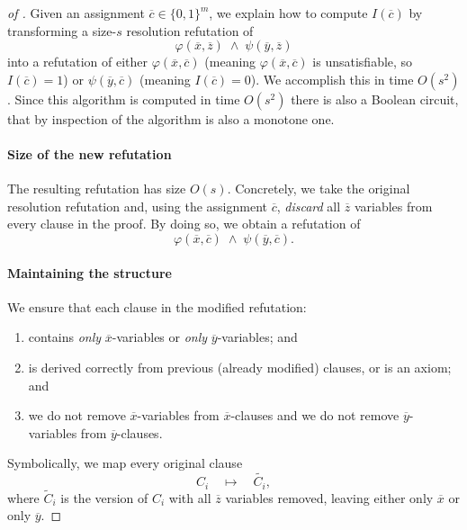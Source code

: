 \begin{proof}[of ]
Given an assignment \(\overline{c} \in \{0,1\}^m\), we explain how to compute \(I(\overline{c})\) by transforming a size-\(s\) resolution refutation of
\[
\varphi(\overline{x},\overline{z}) \;\wedge\; \psi(\overline{y},\overline{z})
\]
into a refutation of either \(\varphi(\overline{x}, \overline{c})\) (meaning \(\varphi(\overline{x}, \overline{c})\) is unsatisfiable, so \(I(\overline{c}) = 1\)) or \(\psi(\overline{y}, \overline{c})\) (meaning \(I(\overline{c}) = 0\)). We accomplish this in time \(O(s^2)\).
Since this algorithm is computed in time $O(s^2)$ there is also a Boolean circuit, that by inspection of the algorithm is also a monotone one. 



\paragraph{Size of the new refutation}
The resulting refutation has size \(O(s)\). Concretely, we take the original resolution refutation and, using the assignment \(\overline{c}\), \emph{discard} all \(\overline{z}\) variables from every clause in the proof. By doing so, we obtain a refutation of
\[
\varphi(\overline{x},\overline{c}) \;\wedge\; \psi(\overline{y},\overline{c}).\]

\paragraph{Maintaining the structure}
We ensure that each clause in the modified refutation:
\begin{enumerate}
\item 
  contains \emph{only} \(\overline{x}\)-variables or \emph{only} \(\overline{y}\)-variables; and 

\item  is derived correctly from previous (already modified) clauses, or is an axiom; and

\item we do not remove $\overline{x}$-variables 
 from $\overline{x}$-clauses and  
we do not remove $\overline{y}$-variables 
 from $\overline{y}$-clauses.
 
\end{enumerate}

Symbolically, we map every original clause
\[
C_i \quad\longmapsto\quad {\widetilde{C_i}},
\]
where \(\widetilde C_i\) is the version of \(C_i\) with all \(\overline{z}\) variables removed, leaving either only \(\overline{x}\) or only \(\overline{y}\).


\end{proof}
